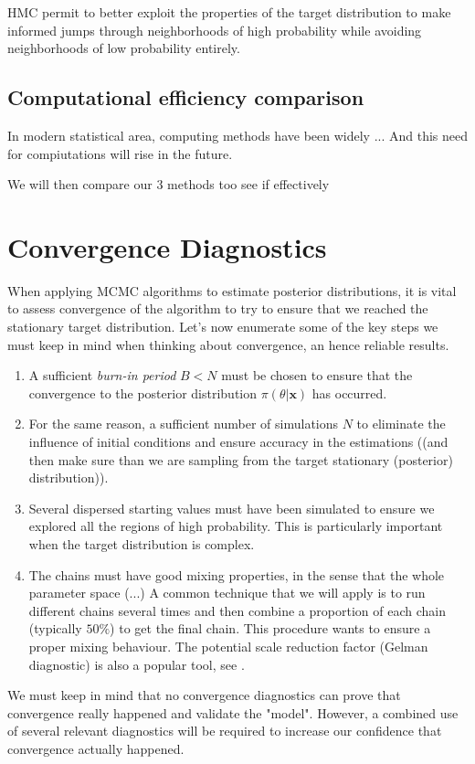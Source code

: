 HMC permit to better exploit the properties of
the target distribution to make informed jumps through neighborhoods of high probability while avoiding neighborhoods of low probability entirely.


\subsection{Computational efficiency comparison}

In modern statistical area, computing methods have been widely ... 
And this need for compiutations will rise in the future. 

We will then compare our 3 methods too see if effectively


\section{Convergence Diagnostics}

When applying MCMC algorithms to estimate posterior distributions, it is vital to assess convergence of the algorithm to try to ensure that we reached the stationary target distribution. Let's now enumerate some of the key steps we must keep in mind when thinking about convergence, an hence reliable results.

\begin{enumerate}
	\item A sufficient \emph{burn-in period} $B<N$ must be chosen to ensure that the convergence to the posterior distribution $\pi(\theta|\boldsymbol{x})$ has occurred. 
	\item For the same reason, a sufficient number of simulations $N$ to eliminate the influence of initial conditions and ensure accuracy in the estimations ((and then make sure than we are sampling from the target stationary (posterior) distribution)).
	\item Several dispersed starting values must have been simulated to ensure we explored all the regions of high probability. This is particularly important when the target distribution is complex.
	\item\label{convdiag4} The chains must have good mixing properties, in the sense that the whole parameter space (...) 
	A common technique that we will apply is to run different chains several times and then combine a proportion of each chain (typically $50\%$) to get the final chain. This procedure wants to ensure a proper mixing behaviour. 
	The potential scale reduction factor (Gelman diagnostic) is also a popular tool, see .
\end{enumerate}
We must keep in mind that no convergence diagnostics can prove that convergence really happened and validate the "model".
However, a combined use of several relevant diagnostics will be required to increase our confidence that convergence actually happened.

